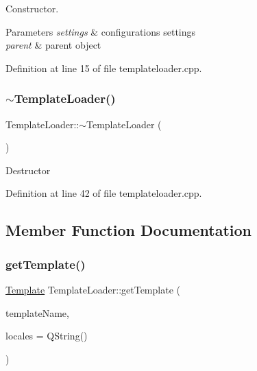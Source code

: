 Constructor. 
\begin{DoxyParams}{Parameters}
{\em settings} & configurations settings \\
\hline
{\em parent} & parent object \\
\hline
\end{DoxyParams}


Definition at line 15 of file templateloader.\+cpp.

\mbox{\label{classstefanfrings_1_1_template_loader_a6914af0af09bc3f0e00f373c23e79382}} 
\subsubsection{\texorpdfstring{$\sim$\+Template\+Loader()}{~TemplateLoader()}}
{\footnotesize\ttfamily Template\+Loader\+::$\sim$\+Template\+Loader (\begin{DoxyParamCaption}{ }\end{DoxyParamCaption})\hspace{0.3cm}{\ttfamily [virtual]}}

Destructor 

Definition at line 42 of file templateloader.\+cpp.



\subsection{Member Function Documentation}
\mbox{\label{classstefanfrings_1_1_template_loader_ae8639b349ec9c9a01ec82ea1ed8d0af8}} 
\subsubsection{\texorpdfstring{get\+Template()}{getTemplate()}}
{\footnotesize\ttfamily \mbox{\hyperlink{classstefanfrings_1_1_template}{Template}} Template\+Loader\+::get\+Template (\begin{DoxyParamCaption}\item[{Q\+String}]{template\+Name,  }\item[{Q\+String}]{locales = {\ttfamily QString()} }\end{DoxyParamCaption})}

